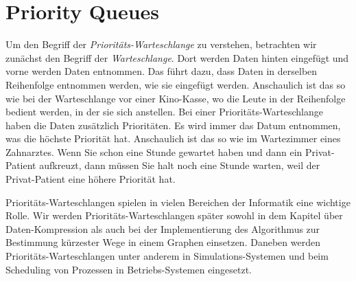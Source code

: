 \chapter{Priority Queues \label{chap:prioqueue}}
Um den Begriff der  \emph{Priorit\"ats-Warteschlange} zu verstehen, betrachten wir zun\"achst
den Begriff der \emph{Warteschlange}.  Dort werden Daten hinten eingef\"ugt und vorne werden
Daten entnommen. Das f\"uhrt dazu, dass Daten in derselben Reihenfolge entnommen werden,
wie sie eingef\"ugt werden.  Anschaulich ist das so wie bei der Warteschlange vor einer
Kino-Kasse, wo die Leute in der Reihenfolge bedient werden, in der sie sich anstellen.
Bei einer Priorit\"ats-Warteschlange haben die Daten zus\"atzlich Priorit\"aten.  Es wird immer
das Datum entnommen, was die h\"ochste Priorit\"at hat.  Anschaulich ist das so wie im
Wartezimmer eines Zahnarztes. Wenn Sie schon eine Stunde gewartet haben und dann ein
Privat-Patient aufkreuzt, dann m\"ussen Sie halt noch eine Stunde warten, weil der
Privat-Patient eine h\"ohere Priorit\"at hat.

Priorit\"ats-Warteschlangen spielen in vielen Bereichen der Informatik  eine wichtige
Rolle.  Wir werden Priorit\"ats-Warteschlangen sp\"ater sowohl in dem Kapitel \"uber
Daten-Kompression als auch bei der Implementierung des Algorithmus zur Bestimmung
k\"urzester Wege in einem Graphen einsetzen.  Daneben werden Priorit\"ats-Warteschlangen unter anderem in
Simulations-Systemen und beim Scheduling von Prozessen in Betriebs-Systemen eingesetzt.


